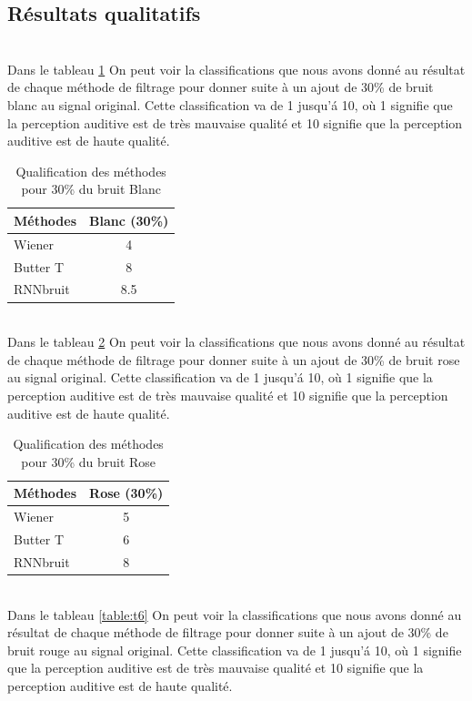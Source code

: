 \documentclass[conference,onecolumn]{IEEEtran}
\begin{document}
\subsection{Résultats qualitatifs}
\hfill \\
Dans le tableau \ref{table:t4} On peut voir la classifications que nous avons donné au résultat de chaque méthode de filtrage pour donner suite à un ajout de 30\% de bruit blanc au signal original. Cette classification va de 1 jusqu'á 10, où 1 signifie que la perception auditive est de très mauvaise qualité et 10 signifie que la perception auditive est de haute qualité.
\begin{table}[H]
    \centering
    \begin{tabular}{ l  c }
    \textbf{Méthodes} & \textbf{Blanc (30\%)} \\
    \hline
    Wiener &  4\\
    Butter T &  8 \\
    RNNbruit &  8.5 \\
    \end{tabular}
    \caption{Qualification des méthodes pour 30\% du bruit Blanc}
    \label{table:t4}
\end{table}
\hfill \\
Dans le tableau \ref{table:t5} On peut voir la classifications que nous avons donné au résultat de chaque méthode de filtrage pour donner suite à un ajout de 30\% de bruit rose au signal original. Cette classification va de 1 jusqu'á 10, où 1 signifie que la perception auditive est de très mauvaise qualité et 10 signifie que la perception auditive est de haute qualité.  
\begin{table}[H]
    \centering
    \begin{tabular}{ l  c }
    \textbf{Méthodes} & \textbf{Rose (30\%)} \\
    \hline
    Wiener & 5 \\
    Butter T &  6 \\
    RNNbruit &  8 \\
    \end{tabular}
    \caption{Qualification des méthodes pour 30\% du bruit Rose}
    \label{table:t5}
\end{table}
\hfill \\
Dans le tableau \ref{table:t6} On peut voir la classifications que nous avons donné au résultat de chaque méthode de filtrage pour donner suite à un ajout de 30\% de bruit rouge au signal original. Cette classification va de 1 jusqu'á 10, où 1 signifie que la perception auditive est de très mauvaise qualité et 10 signifie que la perception auditive est de haute qualité.
\end{document}

